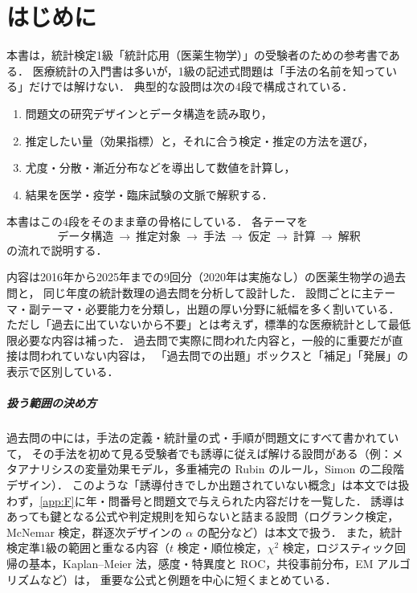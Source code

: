 \chapter*{はじめに}

本書は，統計検定1級「統計応用（医薬生物学）」の受験者のための参考書である．
医療統計の入門書は多いが，1級の記述式問題は「手法の名前を知っている」だけでは解けない．
典型的な設問は次の4段で構成されている．
\begin{enumerate}[label=(\arabic*)]
\item 問題文の研究デザインとデータ構造を読み取り，
\item 推定したい量（効果指標）と，それに合う検定・推定の方法を選び，
\item 尤度・分散・漸近分布などを導出して数値を計算し，
\item 結果を医学・疫学・臨床試験の文脈で解釈する．
\end{enumerate}
本書はこの4段をそのまま章の骨格にしている．
各テーマを
\[
\boxed{\ \text{データ構造}\ \rightarrow\ \text{推定対象}\ \rightarrow\ \text{手法}\ \rightarrow\ \text{仮定}\ \rightarrow\ \text{計算}\ \rightarrow\ \text{解釈}\ }
\]
の流れで説明する．

内容は2016年から2025年までの9回分（2020年は実施なし）の医薬生物学の過去問と，
同じ年度の統計数理の過去問を分析して設計した．
設問ごとに主テーマ・副テーマ・必要能力を分類し，出題の厚い分野に紙幅を多く割いている．
ただし「過去に出ていないから不要」とは考えず，標準的な医療統計として最低限必要な内容は補った．
過去問で実際に問われた内容と，一般的に重要だが直接は問われていない内容は，
「過去問での出題」ボックスと「補足」「発展」の表示で区別している．

\paragraph{扱う範囲の決め方}
過去問の中には，手法の定義・統計量の式・手順が問題文にすべて書かれていて，
その手法を初めて見る受験者でも誘導に従えば解ける設問がある（例：メタアナリシスの変量効果モデル，多重補完の Rubin のルール，Simon の二段階デザイン）．
このような「誘導付きでしか出題されていない概念」は本文では扱わず，\cref{app:F}に年・問番号と問題文で与えられた内容だけを一覧した．
誘導はあっても鍵となる公式や判定規則を知らないと詰まる設問（ログランク検定，McNemar 検定，群逐次デザインの $\alpha$ の配分など）は本文で扱う．
また，統計検定準1級の範囲と重なる内容（$t$ 検定・順位検定，$\chi^2$ 検定，ロジスティック回帰の基本，Kaplan--Meier 法，感度・特異度と ROC，共役事前分布，EM アルゴリズムなど）は，
重要な公式と例題を中心に短くまとめている．

